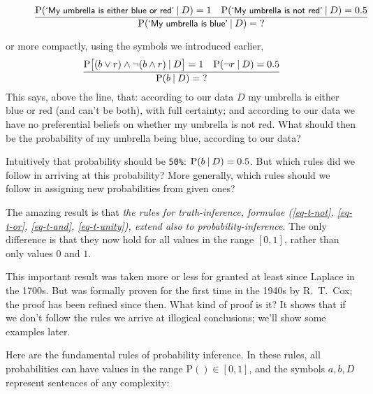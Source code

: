 \documentclass[
  a4paper,
  DIV=11,
  numbers=noendperiod,
  oneside]{scrreprt}
\begin{document}
\begin{figure}

\[
\frac{
\mathrm{P}(\textsf{\small`My umbrella is either blue or red'}\nonscript\:\vert\nonscript\:\mathopen{}D)=1\quad
\mathrm{P}(\textsf{\small`My umbrella is not red'} \nonscript\:\vert\nonscript\:\mathopen{} D)=0.5
}{
\mathrm{P}(\textsf{\small`My umbrella is blue'} \nonscript\:\vert\nonscript\:\mathopen{} D) = \mathord{?}
}
\]

\end{figure}

or more compactly, using the symbols we introduced earlier, \[
\frac{
\mathrm{P}\bigl[(b \lor r) \land \lnot (b \land r)\nonscript\:\vert\nonscript\:\mathopen{}D\bigr]=1\quad
\mathrm{P}(\lnot r\nonscript\:\vert\nonscript\:\mathopen{} D)=0.5
}{
\mathrm{P}( b \nonscript\:\vert\nonscript\:\mathopen{} D) = \mathord{?}
}
\] This says, above the line, that: according to our data \(D\) my
umbrella is either blue or red (and can't be both), with full certainty;
and according to our data we have no preferential beliefs on whether my
umbrella is not red. What should then be the probability of my umbrella
being blue, according to our data?

Intuitively that probability should be \texttt{50\%}:
\(\mathrm{P}( b \nonscript\:\vert\nonscript\:\mathopen{} D)=0.5\). But
which rules did we follow in arriving at this probability? More
generally, which rules should we follow in assigning new probabilities
from given ones?

The amazing result is that \emph{the rules for truth-inference, formulae
(\ref{eq-t-not}, \ref{eq-t-or}, \ref{eq-t-and}, \ref{eq-t-unity}),
extend also to probability-inference}. The only difference is that they
now hold for all values in the range \([0,1]\), rather than only values
\(0\) and \(1\).

This important result was taken more or less for granted at least since
Laplace in the 1700s. But was formally proven for the first time in the
1940s by R.~T.~Cox; the proof has been refined since then. What kind of
proof is it? It shows that if we don't follow the rules we arrive at
illogical conclusions; we'll show some examples later.

Here are the fundamental rules of probability inference. In these rules,
all probabilities can have values in the range
\(\mathrm{P}() \in [0,1]\), and the symbols \(a,b,D\) represent
sentences of any complexity:
\end{document}
